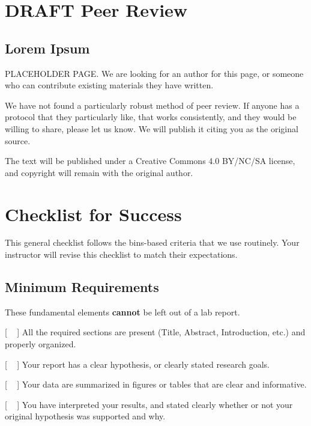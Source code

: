\documentclass[
]{book}
\begin{document}
\hypertarget{peerreview630}{%
\chapter{DRAFT Peer Review}\label{peerreview630}}

\hypertarget{lorem-ipsum}{%
\section{Lorem Ipsum}\label{lorem-ipsum}}

PLACEHOLDER PAGE. We are looking for an author for this page, or someone who can contribute existing materials they have written.

We have not found a particularly robust method of peer review. If anyone has a protocol that they particularly like, that works consistently, and they would be willing to share, please let us know. We will publish it citing you as the original source.

The text will be published under a Creative Commons 4.0 BY/NC/SA license, and copyright will remain with the original author.

\hypertarget{submissioncheck650}{%
\chapter{Checklist for Success}\label{submissioncheck650}}

This general checklist follows the bins-based criteria that we use routinely. Your instructor will revise this checklist to match their expectations.

\hypertarget{minimum-requirements}{%
\section*{Minimum Requirements}\label{minimum-requirements}}

These fundamental elements \textbf{cannot} be left out of a lab report.

{[} ~ {]} All the required sections are present (Title, Abstract, Introduction, etc.) and properly organized.

{[} ~ {]} Your report has a clear hypothesis, or clearly stated research goals.

{[} ~ {]} Your data are summarized in figures or tables that are clear and informative.

{[} ~ {]} You have interpreted your results, and stated clearly whether or not your original hypothesis was supported and why.
\end{document}
